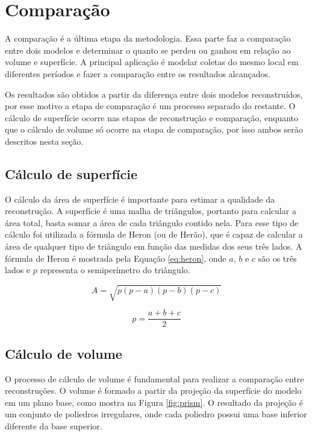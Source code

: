 \section{Comparação}
\label{sec:comparacao}

A comparação é a última etapa da metodologia. 
Essa parte faz a comparação entre dois modelos e determinar o quanto se perdeu ou ganhou em relação ao volume e superfície. 
A principal aplicação é modelar coletas do mesmo local em diferentes períodos e fazer a comparação entre os resultados alcançados.

Os resultados são obtidos a partir da diferença entre dois modelos reconstruídos, por esse motivo a etapa de comparação é um processo separado do restante. 
O cálculo de superfície ocorre nas etapas de reconstrução e comparação, enquanto que o cálculo de volume só ocorre na etapa de comparação, por isso ambos serão descritos nesta seção.

\subsection{Cálculo de superfície}
\label{sec:surface_calc}

O cálculo da área de superfície é importante para estimar a qualidade da reconstrução.
A superfície é uma malha de triângulos, portanto para calcular a área total, basta somar a área de cada triângulo contido nela. 
Para esse tipo de cálculo foi utilizada a fórmula de Heron (ou de Herão), que é capaz de calcular a área de qualquer tipo de triângulo em função das medidas dos seus três lados.
A fórmula de Heron é mostrada pela Equação \ref{eq:heron}, onde $a$, $b$ e $c$ são os três lados e $p$ representa o semiperímetro do triângulo.

\begin{equation}
    A = \sqrt{p(p-a)(p-b)(p-c)}
    \label{eq:heron}
\end{equation}

\begin{equation}
    p = \frac{a+b+c}{2}
    \label{eq:heron_p}
\end{equation}


\subsection{Cálculo de volume}
\label{sec:volume_calc}

O processo de cálculo de volume é fundamental para realizar a comparação entre reconstruções.
O volume é formado a partir da projeção da superfície do modelo em um plano base, como mostra na Figura \ref{fig:prism}.
O resultado da projeção é um conjunto de poliedros irregulares, onde cada poliedro possui uma base inferior diferente da base superior.

